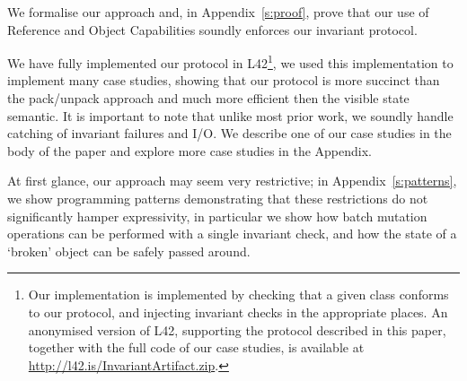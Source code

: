 We formalise our approach and, in Appendix~\ref{s:proof}, prove that our use of Reference and Object Capabilities soundly enforces our invariant protocol.

We have fully implemented our protocol in L42\footnote{
Our implementation is implemented by checking that a given class conforms to our protocol, and injecting invariant checks in the appropriate places.
An anonymised version of L42, supporting the protocol described in this paper, together with the full code of our case studies, is available at \url{http://l42.is/InvariantArtifact.zip}. %
}, we used this implementation to implement many case studies, showing that our protocol is more succinct than the pack/unpack approach and much more efficient then the visible state semantic.
It is important to note that unlike most prior work, we soundly handle catching of invariant failures and I/O.
We describe one of our case studies in the body of the paper and explore more case studies in the Appendix.

At first glance, our approach may seem very restrictive; in Appendix~\ref{s:patterns}, we show
programming patterns demonstrating that these restrictions do not significantly hamper expressivity, in particular we show how batch mutation operations can be performed with a single invariant check, and how the state of a `broken' object can be safely passed around.


